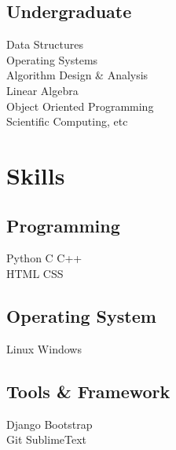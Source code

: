 \documentclass[]{deedy-resume-openfont}
\begin{document}
\begin{minipage}[t]{0.33\textwidth}


\subsection{Undergraduate}
Data Structures \\
Operating Systems \\
Algorithm Design \& Analysis \\
Linear Algebra \\
Object Oriented Programming \\
Scientific Computing, etc \\
\sectionsep


\section{Skills}
\subsection{Programming}
Python \textbullet{} C \textbullet{} C++ \\
HTML \textbullet{} CSS
\subsection{Operating System}
Linux \textbullet{} Windows
\subsection{Tools \& Framework}
Django \textbullet{} Bootstrap \\
Git \textbullet SublimeText
\sectionsep


\end{minipage}
\end{document}

